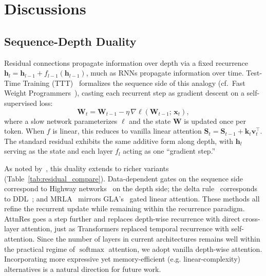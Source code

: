 \section{Discussions}

\subsection{Sequence-Depth Duality}
\label{sec:depth-ttt}

Residual connections propagate information over depth via a fixed recurrence $\bm{h}_{l} = \bm{h}_{l-1} + f_{l-1}(\bm{h}_{l-1})$, much as RNNs propagate information over time.
Test-Time Training (TTT)~\cite{sun-2024-learning} formalizes the sequence side of this analogy (cf.\ Fast Weight Programmers~\cite{schmidhuber1992learning,munkhdalai-2019-metalearned}), casting each recurrent step as gradient descent on a self-supervised loss:
\begin{equation}
    \mathbf{W}_t = \mathbf{W}_{t-1} - \eta\,\nabla\ell(\mathbf{W}_{t-1};\, \bm{x}_t),
\end{equation}
where a slow network parameterizes $\ell$ and the state $\mathbf{W}$ is updated once per token.
When $f$ is linear, this reduces to vanilla linear attention $\mathbf{S}_{t} = \mathbf{S}_{t-1} + \bm{k}_t\bm{v}_t^\top$.
The standard residual exhibits the same additive form along depth, with $\bm{h}_l$ serving as the state and each layer $f_l$ acting as one ``gradient step.''

As noted by~\cite{chen2026postlayernorm}, this duality extends to richer variants (Table~\ref{tab:residual_compare}).
Data-dependent gates on the sequence side~\cite{sun-2023-retnet,yang-etal-2024-gla} correspond to Highway networks~\cite{srivastava2015highway} on the depth side;
the delta rule~\cite{schlag-2021-deltanet,yang-2025-gdn,zhang2025kimi} corresponds to DDL~\cite{zhang2026ddl};
and MRLA~\cite{fang2023cross} mirrors GLA's~\cite{yang-etal-2024-gla} gated linear attention.
These methods all refine the recurrent update while remaining within the recurrence paradigm.
AttnRes goes a step further and replaces depth-wise recurrence with direct cross-layer attention, just as Transformers replaced temporal recurrence with self-attention.
Since the number of layers in current architectures remains well within the practical regime of $\operatorname{softmax}$ attention, we adopt vanilla depth-wise attention. Incorporating more expressive yet memory-efficient (e.g. linear-complexity) alternatives is a natural direction for future work.

